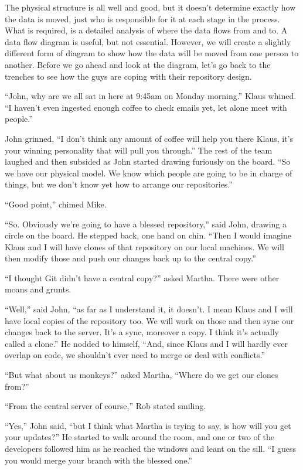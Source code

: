 The physical structure is all well and good, but it doesn't determine exactly how the data is moved, just who is responsible for it at each stage in the process.
What is required, is a detailed analysis of where the data flows from and to.
A data flow diagram is useful, but not essential.
However, we will create a slightly different form of diagram to show how the data will be moved from one person to another.
Before we go ahead and look at the diagram, let's go back to the trenches to see how the guys are coping with their repository design.

\begin{trenches}
``John, why are we all sat in here at 9:45am on Monday morning.'' Klaus whined.
``I haven't even ingested enough coffee to check emails yet, let alone meet with people.''

John grinned, ``I don't think any amount of coffee will help you there Klaus, it's your winning personality that will pull you through.''
The rest of the team laughed and then subsided as John started drawing furiously on the board.
``So we have our physical model. We know which people are going to be in charge of things, but we don't know yet how to arrange our repositories.''

``Good point,'' chimed Mike.

``So. Obviously we're going to have a blessed repository,'' said John, drawing a circle on the board.
He stepped back, one hand on chin.
``Then I would imagine Klaus and I will have clones of that repository on our local machines. We will then modify those and push our changes back up to the central copy.''

``I thought Git didn't have a central copy?'' asked Martha.
There were other moans and grunts.

``Well,'' said John,
``as far as I understand it, it doesn't. I mean Klaus and I will have local copies of the repository too. We will work on those and then sync our changes back to the server. It's a sync, moreover a copy. I think it's actually called a clone.''
He nodded to himself, ``And, since Klaus and I will hardly ever overlap on code, we shouldn't ever need to merge or deal with conflicts.''

``But what about us monkeys?'' asked Martha,
``Where do we get our clones from?''

``From the central server of course,'' Rob stated smiling.

``Yes,'' John said,
``but I think what Martha is trying to say, is how will you get your updates?''
He started to walk around the room, and one or two of the developers followed him as he reached the windows and leant on the sill.
``I guess you would merge your branch with the blessed one.''


\end{trenches}
